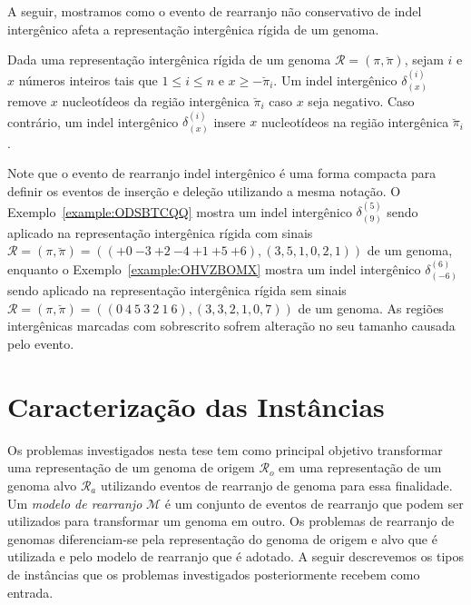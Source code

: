 \pagebreak



A seguir, mostramos como o evento de rearranjo não conservativo de indel intergênico afeta a representação intergênica rígida de um genoma.

\begin{definition}
Dada uma representação intergênica rígida de um genoma $\mathcal{R} = (\pi,\breve\pi)$, sejam $i$ e $x$ números inteiros tais que $1 \le i \le n$ e $x \ge -\breve\pi_i$. Um indel intergênico $\delta^{(i)}_{(x)}$ remove $x$ nucleotídeos da região intergênica $\breve\pi_i$ caso $x$ seja negativo. Caso contrário, um indel intergênico $\delta^{(i)}_{(x)}$ insere $x$ nucleotídeos na região intergênica $\breve\pi_i$.
\end{definition}

Note que o evento de rearranjo indel intergênico é uma forma compacta para definir os eventos de inserção e deleção utilizando a mesma notação. O Exemplo~\ref{example:ODSBTCQQ} mostra um indel intergênico $\delta^{(5)}_{(9)}$ sendo aplicado na representação intergênica rígida com sinais $\mathcal{R} = (\pi,\breve\pi) = \allowbreak(({+0}~{-3}~{+2}~{-4}~{+1}~{+5}~{+6}),\allowbreak(3,5,1,0,2,1))$ de um genoma, enquanto o Exemplo~\ref{example:OHVZBOMX} mostra um indel intergênico $\delta^{(6)}_{(-6)}$ sendo aplicado na representação intergênica rígida sem sinais $\mathcal{R} = (\pi,\breve\pi) = \allowbreak(({0}~{4}~{5}~{3}~{2}~{1}~{6}),\allowbreak(3,3,2,1,0,7))$ de um genoma. As regiões intergênicas marcadas com sobrescrito sofrem alteração no seu tamanho causada pelo evento.





\section{Caracterização das Instâncias}

Os problemas investigados nesta tese tem como principal objetivo transformar uma representação de um genoma de origem $\mathcal{R}_{o}$ em uma representação de um genoma alvo $\mathcal{R}_{a}$ utilizando eventos de rearranjo de genoma para essa finalidade. Um \emph{modelo de rearranjo} $\mathcal{M}$ é um conjunto de eventos de rearranjo que podem ser utilizados para transformar um genoma em outro. Os problemas de rearranjo de genomas diferenciam-se pela representação do genoma de origem e alvo que é utilizada e pelo modelo de rearranjo que é adotado. A seguir descrevemos os tipos de instâncias que os problemas investigados posteriormente recebem como entrada. 

